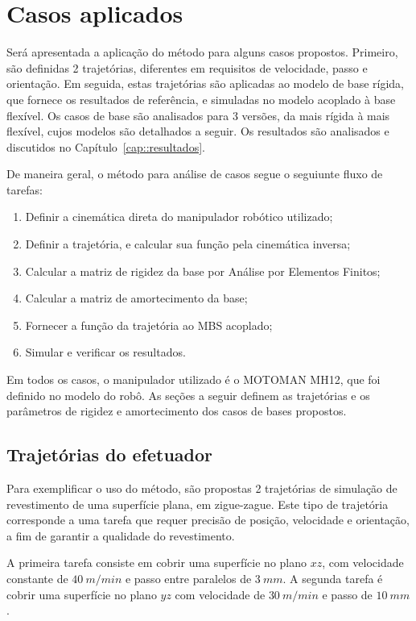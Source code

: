 \section{Casos aplicados}\label{sec::casos}

Será apresentada a aplicação do método para alguns casos propostos. Primeiro,
são definidas 2 trajetórias, diferentes em requisitos de velocidade, passo e
orientação. Em seguida, estas trajetórias são aplicadas ao modelo de base
rígida, que fornece os resultados de referência, e simuladas no modelo acoplado
à base flexível. Os casos de base são analisados para 3 versões, da mais rígida
à mais flexível, cujos modelos são detalhados a seguir. Os resultados são
analisados e discutidos no Capítulo~\ref{cap::resultados}.

De maneira geral, o método para análise de casos segue o seguiunte fluxo de
tarefas:
%
\begin{enumerate}
  \item Definir a cinemática direta do manipulador robótico utilizado;
  \item Definir a trajetória, e calcular sua função pela cinemática inversa;
  \item Calcular a matriz de rigidez da base por Análise por Elementos Finitos;
  \item Calcular a matriz de amortecimento da base;
  \item Fornecer a função da trajetória ao MBS acoplado;
  \item Simular e verificar os resultados.
\end{enumerate}

Em todos os casos, o manipulador utilizado é o MOTOMAN MH12, que foi definido
no modelo do robô. As seções a seguir definem as trajetórias e os parâmetros
de rigidez e amortecimento dos casos de bases propostos.

\subsection{Trajetórias do efetuador}

Para exemplificar o uso do método, são propostas 2 trajetórias de simulação de
revestimento de uma superfície plana, em zigue-zague. Este tipo de trajetória
corresponde a uma tarefa que requer precisão de posição, velocidade e
orientação, a fim de garantir a qualidade do revestimento.

A primeira tarefa consiste em cobrir uma superfície no plano $xz$, com
velocidade constante de $40~m/min$ e passo entre paralelos de $3~mm$. A segunda
tarefa é cobrir uma superfície no plano $yz$ com velocidade de $30~m/min$ e
passo de $10~mm$.

